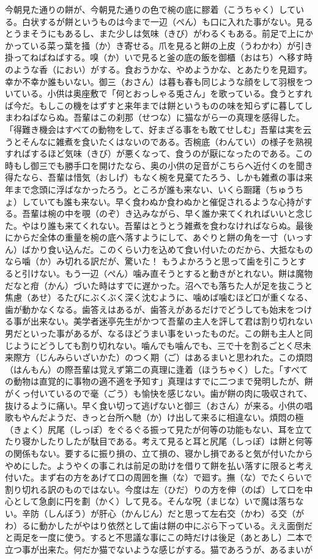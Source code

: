 \documentclass{book}
\begin{document}
今朝見た通りの餅が、今朝見た通りの色で椀の底に膠着（こうちゃく）している。白状するが餅というものは今まで一辺（ぺん）も口に入れた事がない。見るとうまそうにもあるし、また少しは気味（きび）がわるくもある。前足で上にかかっている菜っ葉を掻（か）き寄せる。爪を見ると餅の上皮（うわかわ）が引き掛ってねばねばする。嗅（か）いで見ると釜の底の飯を御櫃（おはち）へ移す時のような香（におい）がする。食おうかな、やめようかな、とあたりを見廻す。幸か不幸か誰もいない。御三（おさん）は暮も春も同じような顔をして羽根をついている。小供は奥座敷で「何とおっしゃる兎さん」を歌っている。食うとすれば今だ。もしこの機をはずすと来年までは餅というものの味を知らずに暮してしまわねばならぬ。吾輩はこの刹那（せつな）に猫ながら一の真理を感得した。「得難き機会はすべての動物をして、好まざる事をも敢てせしむ」吾輩は実を云うとそんなに雑煮を食いたくはないのである。否椀底（わんてい）の様子を熟視すればするほど気味（きび）が悪くなって、食うのが厭になったのである。この時もし御三でも勝手口を開けたなら、奥の小供の足音がこちらへ近付くのを聞き得たなら、吾輩は惜気（おしげ）もなく椀を見棄てたろう、しかも雑煮の事は来年まで念頭に浮ばなかったろう。ところが誰も来ない、いくら蹰躇（ちゅうちょ）していても誰も来ない。早く食わぬか食わぬかと催促されるような心持がする。吾輩は椀の中を覗（のぞ）き込みながら、早く誰か来てくれればいいと念じた。やはり誰も来てくれない。吾輩はとうとう雑煮を食わなければならぬ。最後にからだ全体の重量を椀の底へ落すようにして、あぐりと餅の角を一寸（いっすん）ばかり食い込んだ。このくらい力を込めて食い付いたのだから、大抵なものなら噛（か）み切れる訳だが、驚いた！ もうよかろうと思って歯を引こうとすると引けない。もう一辺（ぺん）噛み直そうとすると動きがとれない。餅は魔物だなと疳（かん）づいた時はすでに遅かった。沼へでも落ちた人が足を抜こうと焦慮（あせ）るたびにぶくぶく深く沈むように、噛めば噛むほど口が重くなる、歯が動かなくなる。歯答えはあるが、歯答えがあるだけでどうしても始末をつける事が出来ない。美学者迷亭先生がかつて吾輩の主人を評して君は割り切れない男だといった事があるが、なるほどうまい事をいったものだ。この餅も主人と同じようにどうしても割り切れない。噛んでも噛んでも、三で十を割るごとく尽未来際方（じんみらいざいかた）のつく期（ご）はあるまいと思われた。この煩悶（はんもん）の際吾輩は覚えず第二の真理に逢着（ほうちゃく）した。「すべての動物は直覚的に事物の適不適を予知す」真理はすでに二つまで発明したが、餅がくっ付いているので毫（ごう）も愉快を感じない。歯が餅の肉に吸収されて、抜けるように痛い。早く食い切って逃げないと御三（おさん）が来る。小供の唱歌もやんだようだ、きっと台所へ馳（か）け出して来るに相違ない。煩悶の極（きょく）尻尾（しっぽ）をぐるぐる振って見たが何等の功能もない、耳を立てたり寝かしたりしたが駄目である。考えて見ると耳と尻尾（しっぽ）は餅と何等の関係もない。要するに振り損の、立て損の、寝かし損であると気が付いたからやめにした。ようやくの事これは前足の助けを借りて餅を払い落すに限ると考え付いた。まず右の方をあげて口の周囲を撫（な）で廻す。撫（な）でたくらいで割り切れる訳のものではない。今度は左（ひだ）りの方を伸（のば）して口を中心として急劇に円を劃（かく）して見る。そんな呪（まじな）いで魔は落ちない。辛防（しんぼう）が肝心（かんじん）だと思って左右交（かわ）る交（がわ）るに動かしたがやはり依然として歯は餅の中にぶら下っている。ええ面倒だと両足を一度に使う。すると不思議な事にこの時だけは後足（あとあし）二本で立つ事が出来た。何だか猫でないような感じがする。猫であろうが、あるまいが
\end{document}
